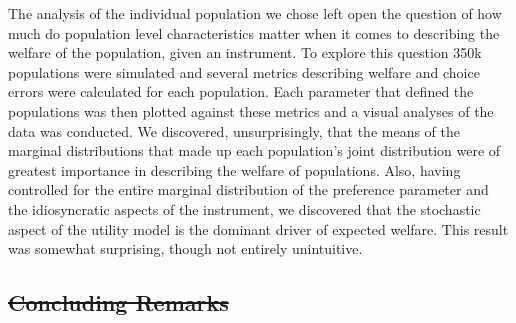 \documentclass[11pt,a4paper]{report}
\providecommand{\DIFdeltex}[1]{{\protect\color{red}\sout{#1}}}                      %
\providecommand{\DIFaddbegin}{} %
\providecommand{\DIFaddend}{} %
\providecommand{\DIFdelbegin}{} %
\providecommand{\DIFdelend}{} %
\providecommand{\DIFdel}[1]{\texorpdfstring{\DIFdeltex{#1}}{}} %
\newcommand{\DIFscaledelfig}{0.5}
\newlength{\DIFdelgraphicswidth} %
\newlength{\DIFdelgraphicsheight} %
\newcommand{\DIFaddincludegraphics}[2][]{{\color{blue}\fbox{\DIFOincludegraphics[#1]{#2}}}} %
\newcommand{\DIFdelincludegraphics}[2][]{%
\sbox{\DIFdelgraphicsbox}{\DIFOincludegraphics[#1]{#2}}%
\settoboxwidth{\DIFdelgraphicswidth}{\DIFdelgraphicsbox} %
\settoboxtotalheight{\DIFdelgraphicsheight}{\DIFdelgraphicsbox} %
\scalebox{\DIFscaledelfig}{%
\parbox[b]{\DIFdelgraphicswidth}{\usebox{\DIFdelgraphicsbox}\\[-\baselineskip] \rule{\DIFdelgraphicswidth}{0em}}\llap{\resizebox{\DIFdelgraphicswidth}{\DIFdelgraphicsheight}{%
\setlength{\unitlength}{\DIFdelgraphicswidth}%
\begin{picture}(1,1)%
\thicklines\linethickness{2pt} %
{\color[rgb]{1,0,0}\put(0,0){\framebox(1,1){}}}%
{\color[rgb]{1,0,0}\put(0,0){\line( 1,1){1}}}%
{\color[rgb]{1,0,0}\put(0,1){\line(1,-1){1}}}%
\end{picture}%
}\hspace*{3pt}}} %
} %
\DeclareRobustCommand{\DIFaddbegin}{\DIFOaddbegin \let\includegraphics\DIFaddincludegraphics} %
\DeclareRobustCommand{\DIFaddend}{\DIFOaddend \let\includegraphics\DIFOincludegraphics} %
\DeclareRobustCommand{\DIFdelbegin}{\DIFOdelbegin \let\includegraphics\DIFdelincludegraphics} %
\DeclareRobustCommand{\DIFdelend}{\DIFOaddend \let\includegraphics\DIFOincludegraphics} %
\begin{document}
\DIFaddbegin 

\DIFaddend The analysis of the individual population we chose left open the question of how much do population level characteristics matter when it comes to describing the welfare of the population, given an instrument.
To explore this question 350k populations were simulated and several metrics describing welfare and choice errors were calculated for each population.
Each parameter that defined the populations was then plotted against these metrics and a visual analyses of the data was conducted.
We discovered, unsurprisingly, that the means of the marginal distributions that made up each population's joint distribution were of greatest importance in describing the welfare of populations.
Also, having controlled for the entire marginal distribution of the preference parameter and the idiosyncratic aspects of the instrument, we discovered that the stochastic aspect of the utility model is the dominant driver of expected welfare.
This result was somewhat surprising, though not entirely unintuitive.

\DIFdelbegin \subsection{\DIFdel{Concluding Remarks}}
\addtocounter{subsection}{-1}%
\DIFdelend %
\end{document}

